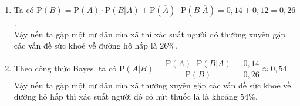 \begin{vd}
{\begin{enumerate}
\begin{center}
			\end{center}
			\item Ta có $\mathrm{P}(B)=\mathrm{P}(A) \cdot \mathrm{P}(B | A)+\mathrm{P}(\overline{A}) \cdot \mathrm{P}\left(B | \overline{A}\right)=0{,}14+0{,}12=0{,}26$.\\
			Vậy nếu ta gặp một cư dân của xã thì xác suất người đó thường xuyên gặp các vấn đề sức khoẻ về đường hô hấp là $26\%$.
			\item Theo công thức Bayes, ta có $\mathrm{P}\left(A | B\right)=\dfrac{\mathrm{P}(A)\cdot \mathrm{P}\left(B| A\right)}{\mathrm{P}(B)}=\dfrac{0{,}14}{0{,}26} \approx 0{,}54$.\\
			Vậy nếu ta gặp một cư dân của xã thường xuyên gặp các vấn đề sức khoẻ về đường hô hấp thì xác suất người đó có hút thuốc lá là khoảng $54\%$.
		\end{enumerate}
	}
\end{vd}
